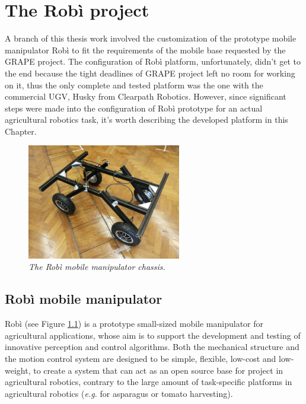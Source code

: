 
\chapter{The Robì project}\label{chap:robìProject}

A branch of this thesis work involved the customization of the prototype mobile manipulator Robì \parencite{robi} to fit the requirements of the mobile base requested by the \ac{GRAPE} project. The configuration of Robì platform, unfortunately, didn't get to the end because the tight deadlines of \ac{GRAPE} project left no room for working on it, thus the only complete and tested platform was the one with the commercial \ac{UGV}, Husky from Clearpath Robotics. However, since significant steps were made into the configuration of Robì prototype for an actual agricultural robotics task, it's worth describing the developed platform in this Chapter.

\begin{figure}
	\centering
	\includegraphics[width=0.6\textwidth]{Images/robi/robi_inizio.png}
	\caption{\textit{The Robì mobile manipulator chassis.}}
	\label{fig:robiDefault}
\end{figure}


\section{Robì mobile manipulator}\label{sec:robiDescr}
Robì (see Figure \ref{fig:robiDefault}) is a prototype small-sized mobile manipulator for agricultural applications, whose aim is to support the development and testing of innovative perception and control algorithms. Both the mechanical structure and the motion control system are designed to be simple, flexible, low-cost and low-weight, to create a system that can act as an open source base for project in agricultural robotics, contrary to the large amount of task-specific platforms in agricultural robotics (\textit{e.g.} for asparagus \parencite{asparagi} or tomato \parencite{pomodori} harvesting).

